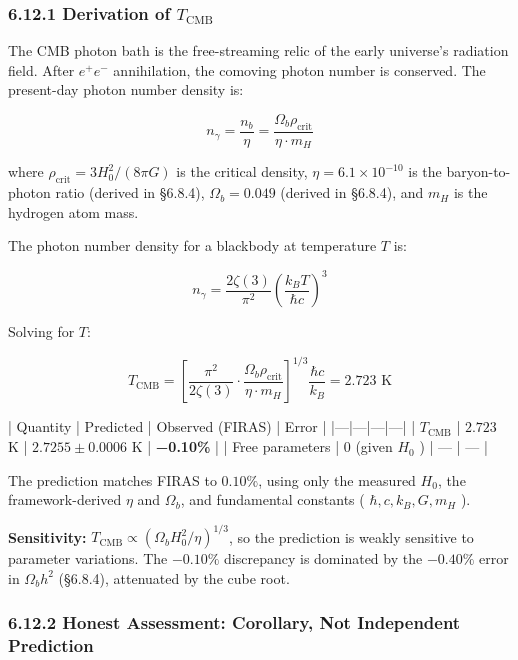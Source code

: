 \documentclass[11pt,a4paper]{article}
\theoremstyle{definition}
\theoremstyle{remark}
\begin{document}
\subsubsection{6.12.1 Derivation of $T_{\text{CMB}}$}

The CMB photon bath is the free-streaming relic of the early universe's radiation field. After $e^+ e^-$ annihilation, the comoving photon number is conserved. The present-day photon number density is:


\begin{equation}
n_\gamma = \frac{n_b}{\eta} = \frac{\Omega_b \rho_{\text{crit}}}{\eta \cdot m_H}
\end{equation}


where $\rho_{\text{crit}} = 3H_0^2/(8\pi G)$ is the critical density, $\eta = 6.1 \times 10^{-10}$ is the baryon-to-photon ratio (derived in \S 6.8.4), $\Omega_b = 0.049$ (derived in \S 6.8.4), and $m_H$ is the hydrogen atom mass.

The photon number density for a blackbody at temperature $T$ is:


\begin{equation}
n_\gamma = \frac{2\zeta(3)}{\pi^2}\left(\frac{k_B T}{\hbar c}\right)^3
\end{equation}


Solving for $T$:


\begin{equation}
\boxed{T_{\text{CMB}} = \left[\frac{\pi^2}{2\zeta(3)} \cdot \frac{\Omega_b \rho_{\text{crit}}}{\eta \cdot m_H}\right]^{1/3} \frac{\hbar c}{k_B} = 2.723 \text{ K}}
\end{equation}


| Quantity | Predicted | Observed (FIRAS) | Error |
|---|---|---|---|
| $T_{\text{CMB}}$ | $2.723$ K | $2.7255 \pm 0.0006$ K | \textbf{−0.10\%} |
| Free parameters | 0 (given $H_0$ ) | — | — |

The prediction matches FIRAS to $0.10\%$, using only the measured $H_0$, the framework-derived $\eta$ and $\Omega_b$, and fundamental constants ( $\hbar, c, k_B, G, m_H$ ).

\textbf{Sensitivity:} $T_{\text{CMB}} \propto (\Omega_b H_0^2 / \eta)^{1/3}$, so the prediction is weakly sensitive to parameter variations. The $-0.10\%$ discrepancy is dominated by the $-0.40\%$ error in $\Omega_b h^2$ (\S 6.8.4), attenuated by the cube root.

\subsubsection{6.12.2 Honest Assessment: Corollary, Not Independent Prediction}
\end{document}
